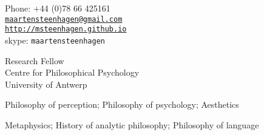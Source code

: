 \documentclass[12pt]{article}
\makeatletter
\def\myemail{maartensteenhagen@gmail.com}
\def\myweb{http://msteenhagen.github.io}
\def\myphone{+44 (0)78 66 425161}
\makeatother
\begin{document}
\begin{minipage}[t]{2.95in}
  
\end{minipage}
\hfill     
\hfill
\begin{minipage}[t]{1.7in}
  \flushright \footnotesize Phone: \myphone \\  
  {\scriptsize  \texttt{\href{mailto:\myemail}{\myemail}}} \\
  {\scriptsize  \texttt{\href{\myweb}{\myweb}}}\\
	{\scriptsize  skype: \texttt{maartensteenhagen}}
\end{minipage}



\bigskip  
\reversemarginpar

\bigskip       

\medskip


\ind Research Fellow\\
Centre for Philosophical Psychology\\
University of Antwerp

\vspace{0.01in}

\medskip


\ind Philosophy of perception; Philosophy of psychology; Aesthetics

\bigskip
\bigskip


\ind Metaphysics; History of analytic philosophy; Philosophy of language

% 
% 
\bigskip
\bigskip
\end{document}
